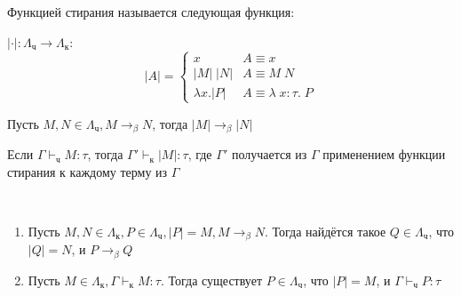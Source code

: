\begin{definition}[Стирание] Функцией стирания называется следующая функция: 
	
$|\cdot| : \Lambda_{\text{ч}} \to \Lambda_{\text{к}}$:
	\[
	|{A}| =
	\begin{cases}
	x                                   & A \equiv x \\
	|M| \; |N| & A \equiv M \; N \\
	\lambda x . |P|           & A \equiv \lambda \; x : \tau. \; P
	\end{cases}
	\]
\end{definition}

\begin{lemma}
	Пусть $M, N \in \Lambda_{\text{ч}}, M \to_\beta N$, тогда $|M| \to_\beta |N|$
\end{lemma}

\begin{lemma}
	Если $\Gamma \vdash_{\text{ч}} M : \tau$, тогда $\Gamma' \vdash_{\text{к}} |M| : \tau$, где $\Gamma'$ получается из $\Gamma$ применением функции стирания к каждому терму из $\Gamma$
\end{lemma}

\begin{theorem} \ 
	\begin{enumerate}
		\item Пусть $M, N \in \Lambda_{\text{к}}, P \in \Lambda_{\text{ч}}, |P| = M, M \to_\beta N$. Тогда найдётся такое $Q \in \Lambda_{\text{ч}}$, что $|Q| = N$, и $P \to_\beta Q$
		\item Пусть $M \in \Lambda_{\text{к}}, \Gamma \vdash_{\text{к}} M : \tau$. Тогда существует $P \in \Lambda_{\text{ч}}$, что $|P| = M$, и $\Gamma \vdash_{\text{ч}} P : \tau$
	\end{enumerate}
\end{theorem}